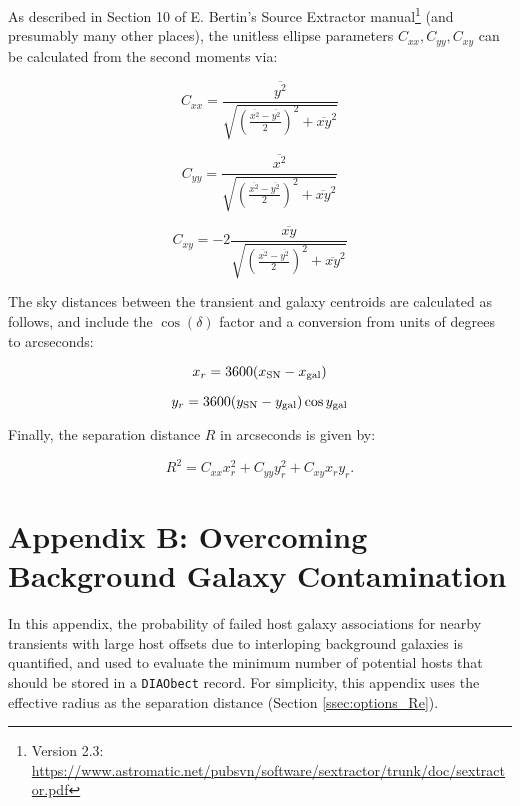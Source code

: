 \documentclass[DM,lsstdraft,authoryear,toc]{lsstdoc}
\begin{document}
As described in Section 10 of E. Bertin's Source Extractor manual\footnote{Version 2.3: \url{https://www.astromatic.net/pubsvn/software/sextractor/trunk/doc/sextractor.pdf}} (and presumably many other places), the unitless ellipse parameters $C_{xx},C_{yy},C_{xy}$ can be calculated from the second moments via:

\begin{equation}
C_{xx} = \frac{\overline{y^2}}{\sqrt{ \left( \frac{\overline{x^2}-\overline{y^2}}{2} \right)^2 + \overline{xy}^2}}
\end{equation}

\begin{equation}
C_{yy} = \frac{\overline{x^2}}{\sqrt{ \left( \frac{\overline{x^2}-\overline{y^2}}{2} \right)^2 + \overline{xy}^2}}
\end{equation}

\begin{equation}
C_{xy} = -2 \frac{\overline{xy}}{\sqrt{ \left( \frac{\overline{x^2}-\overline{y^2}}{2} \right)^2 + \overline{xy}^2}}
\end{equation}

The sky distances between the transient and galaxy centroids are calculated as follows, and include the $\cos(\delta)$ factor and a conversion from units of degrees to arcseconds:

\begin{equation}
x_r = 3600(x_{\rm SN} - x_{\rm gal})
\end{equation}

\begin{equation}
y_r = 3600(y_{\rm SN} - y_{\rm gal})\cos{y_{\rm gal}}
\end{equation}

Finally, the separation distance $R$ in arcseconds is given by:

\begin{equation}
R^2 = C_{xx} x_r^2 + C_{yy} y_r^2 + C_{xy} x_r y_r.
\end{equation}


\clearpage
\section{Appendix B: Overcoming Background Galaxy Contamination}\label{sec:appB}

In this appendix, the probability of failed host galaxy associations for nearby transients with large host offsets due to interloping background galaxies is quantified, and used to evaluate the minimum number of potential hosts that should be stored in a {\tt DIAObect} record. 
For simplicity, this appendix uses the effective radius as the separation distance (Section \ref{ssec:options_Re}).
\end{document}

